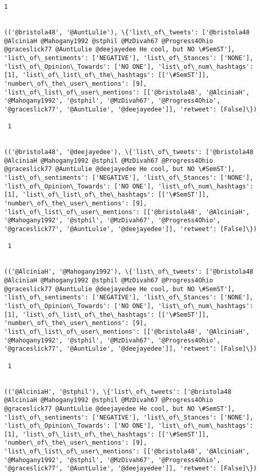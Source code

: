 \documentclass[11pt]{article}
\begin{document}
\begin{Verbatim}[commandchars=\\\{\}]
 1
 

(('@bristola48', '@AuntLulie'), \{'list\_of\_tweets': ['@bristola48 @AlciniaH @Mahogany1992 @stphil @MzDivah67 @Progress4Ohio @graceslick77 @AuntLulie @deejayedee He cool, but NO \#SemST'], 'list\_of\_sentiments': ['NEGATIVE'], 'list\_of\_Stances': ['NONE'], 'list\_of\_Opinion\_Towards': ['NO ONE'], 'list\_of\_num\_hashtags': [1], 'list\_of\_list\_of\_the\_hashtags': [['\#SemST']], 'number\_of\_the\_user\_mentions': [9], 'list\_of\_list\_of\_user\_mentions': [['@bristola48', '@AlciniaH', '@Mahogany1992', '@stphil', '@MzDivah67', '@Progress4Ohio', '@graceslick77', '@AuntLulie', '@deejayedee']], 'retweet': [False]\})

 1
 

(('@bristola48', '@deejayedee'), \{'list\_of\_tweets': ['@bristola48 @AlciniaH @Mahogany1992 @stphil @MzDivah67 @Progress4Ohio @graceslick77 @AuntLulie @deejayedee He cool, but NO \#SemST'], 'list\_of\_sentiments': ['NEGATIVE'], 'list\_of\_Stances': ['NONE'], 'list\_of\_Opinion\_Towards': ['NO ONE'], 'list\_of\_num\_hashtags': [1], 'list\_of\_list\_of\_the\_hashtags': [['\#SemST']], 'number\_of\_the\_user\_mentions': [9], 'list\_of\_list\_of\_user\_mentions': [['@bristola48', '@AlciniaH', '@Mahogany1992', '@stphil', '@MzDivah67', '@Progress4Ohio', '@graceslick77', '@AuntLulie', '@deejayedee']], 'retweet': [False]\})

 1
 

(('@AlciniaH', '@Mahogany1992'), \{'list\_of\_tweets': ['@bristola48 @AlciniaH @Mahogany1992 @stphil @MzDivah67 @Progress4Ohio @graceslick77 @AuntLulie @deejayedee He cool, but NO \#SemST'], 'list\_of\_sentiments': ['NEGATIVE'], 'list\_of\_Stances': ['NONE'], 'list\_of\_Opinion\_Towards': ['NO ONE'], 'list\_of\_num\_hashtags': [1], 'list\_of\_list\_of\_the\_hashtags': [['\#SemST']], 'number\_of\_the\_user\_mentions': [9], 'list\_of\_list\_of\_user\_mentions': [['@bristola48', '@AlciniaH', '@Mahogany1992', '@stphil', '@MzDivah67', '@Progress4Ohio', '@graceslick77', '@AuntLulie', '@deejayedee']], 'retweet': [False]\})

 1
 

(('@AlciniaH', '@stphil'), \{'list\_of\_tweets': ['@bristola48 @AlciniaH @Mahogany1992 @stphil @MzDivah67 @Progress4Ohio @graceslick77 @AuntLulie @deejayedee He cool, but NO \#SemST'], 'list\_of\_sentiments': ['NEGATIVE'], 'list\_of\_Stances': ['NONE'], 'list\_of\_Opinion\_Towards': ['NO ONE'], 'list\_of\_num\_hashtags': [1], 'list\_of\_list\_of\_the\_hashtags': [['\#SemST']], 'number\_of\_the\_user\_mentions': [9], 'list\_of\_list\_of\_user\_mentions': [['@bristola48', '@AlciniaH', '@Mahogany1992', '@stphil', '@MzDivah67', '@Progress4Ohio', '@graceslick77', '@AuntLulie', '@deejayedee']], 'retweet': [False]\})


\end{Verbatim}
\end{document}
